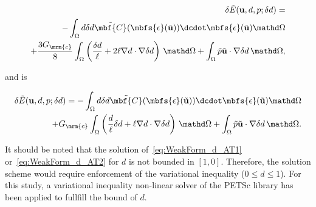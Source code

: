 \begin{align}
\label{eq:WeakForm_d_AT1}
\begin{split}
\delta \tilde{E}(\mathbf{u},d,p; \delta d) =   
\\
-\int_{\Omega} d \delta d \tilde{\mbf{C}}(\mbfs{\epsilon}(\tilde{\mathbf{u}})) \dcdot \mbfs{\epsilon} ( \tilde{\mathbf{u}}) \mathd \Omega \\
+ \frac{3G_\mrm{c}}{8} \int_\Omega \left( \frac{\delta d}{\ell} +2 \ell  \nabla d \cdot \nabla \delta d \right) \, \mathd \Omega
+  \int_\Omega \tilde{p} \tilde{\mathbf{u}} \cdot \nabla \delta d \, \mathd \Omega, \\
\end{split}
\end{align}

and \ATtwo{} is

\begin{align}
\label{eq:WeakForm_d_AT2}
\begin{split}
\delta \tilde{E}(\mathbf{u},d,p; \delta d) =   
-\int_{\Omega} d \delta d \tilde{\mbf{C}}(\mbfs{\epsilon}(\tilde{\mathbf{u}})) \dcdot \mbfs{\epsilon}( \tilde{\mathbf{u}}) \mathd \Omega \\
+ G_\mrm{c} \int_\Omega \left( \frac{d}{\ell} \delta d + \ell  \nabla d \cdot \nabla \delta d \right) \, \mathd \Omega
+  \int_\Omega \tilde{p} \tilde{\mathbf{u}} \cdot \nabla \delta d \, \mathd \Omega. \\
\end{split}
\end{align}

It should be noted that the solution of~\eqref{eq:WeakForm_d_AT1} or~\eqref{eq:WeakForm_d_AT2} for $d$ is not bounded in $[1,0]$.
Therefore, the solution scheme would  require enforcement of the variational inequality ($ 0 \leq d \leq 1$). 
For this study, a variational inequality non-linear solver of the PETSc library \cite{petsc-web-page, petsc-user-ref} has been applied to fullfill the bound of $d$.